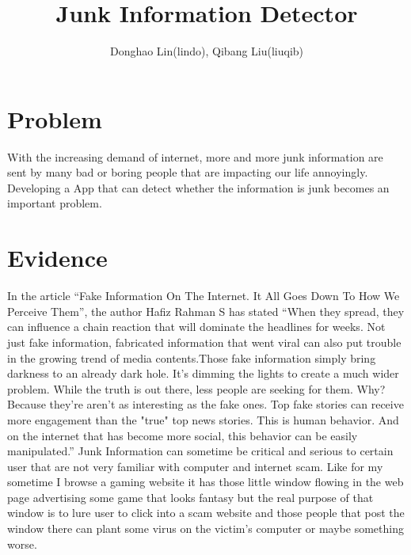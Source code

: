 \documentclass[12pt]{article}
\title{Junk Information Detector}
\author{Donghao Lin(lindo), Qibang Liu(liuqib)}
\begin{document}
\maketitle




\section{Problem}
With the increasing demand of internet, more and more junk information are sent by many bad or boring people that are impacting our life annoyingly. Developing a App that can detect whether the information is junk becomes an important problem.
\section{Evidence}
In the article “Fake Information On The Internet. It All Goes Down To How We Perceive Them”, the author Hafiz Rahman S has stated “When they spread, they can influence a chain reaction that will dominate the headlines for weeks. Not just fake information, fabricated information that went viral can also put trouble in the growing trend of media contents.Those fake information simply bring darkness to an already dark hole. It's dimming the lights to create a much wider problem. While the truth is out there, less people are seeking for them. Why? Because they're aren't as interesting as the fake ones. Top fake stories can receive more engagement than the "true" top news stories. This is human behavior. And on the internet that has become more social, this behavior can be easily manipulated.” Junk Information can sometime be critical and serious to certain user that are not very familiar with computer and internet scam. Like for my sometime I browse a gaming website it has those little window flowing in the web page advertising some game that looks fantasy but the real purpose of that window is to lure user to click into a scam website and those people that post the window there can plant some virus on the victim's computer or maybe something worse.
\end{document}

